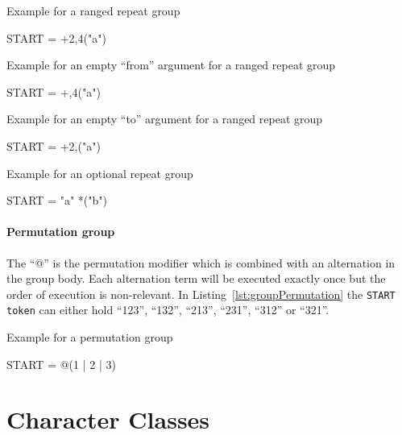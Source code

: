 \begin{listing}
\caption{Example for a ranged repeat group}
\label{lst:groupRangedRepeat}
\begin{gocode}
START = +2,4("a")
\end{gocode}
\end{listing}

\begin{listing}
\caption{Example for an empty ``from'' argument for a ranged repeat group}
\label{lst:groupEmptyFromArgumentRepeatGroup}
\begin{gocode}
START = +,4("a")
\end{gocode}
\end{listing}

\begin{listing}
\caption{Example for an empty ``to'' argument for a ranged repeat group}
\label{lst:groupEmptyToArgumentRepeatGroup}
\begin{gocode}
START = +2,("a")
\end{gocode}
\end{listing}

\begin{listing}
\caption{Example for an optional repeat group}
\label{lst:groupOptionalRepeat}
\begin{gocode}
START = "a" *("b")
\end{gocode}
\end{listing}

\paragraph{Permutation group}
\label{subsec:groupPermutation}

The \enquote{@} is the permutation modifier which is combined with an alternation in the group body. Each alternation term will be executed exactly once but the order of execution is non-relevant. In Listing~\ref{lst:groupPermutation} the \texttt{START token} can either hold \enquote{123}, \enquote{132}, \enquote{213}, \enquote{231}, \enquote{312} or \enquote{321}.

\begin{listing}
\caption{Example for a permutation group}
\label{lst:groupPermutation}
\begin{gocode}
START = @(1 | 2 | 3)
\end{gocode}
\end{listing}

\section{Character Classes}
\label{sec:characterClasses}

